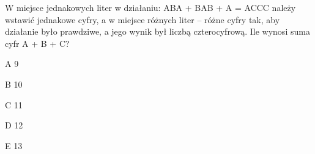 \begin{tresc}
W miejsce jednakowych liter w działaniu: ABA + BAB + A = ACCC należy wstawić jednakowe cyfry, a w miejsce różnych liter – różne cyfry tak, aby działanie było prawdziwe, a jego wynik był liczbą czterocyfrową. Ile wynosi suma cyfr A + B + C?
\end{tresc}
\begin{wariant}{A} 9 \end{wariant}
\begin{wariant}{B} 10 \end{wariant}
\begin{wariant}{C} 11 \end{wariant}
\begin{wariant}{D} 12 \end{wariant}
\begin{wariant}{E} 13 \end{wariant}
